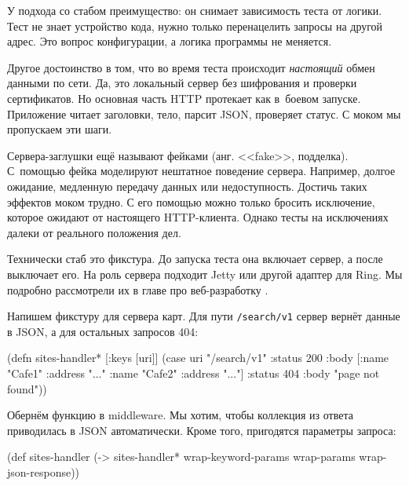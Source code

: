 У подхода со стабом преимущество: он снимает зависимость теста от логики. Тест
не знает устройство кода, нужно только перенацелить запросы на другой адрес. Это
вопрос конфигурации, а логика программы не меняется.

Другое достоинство в том, что во время теста происходит \emph{настоящий} обмен
данными по сети. Да, это локальный сервер без шифрования и проверки
сертификатов. Но основная часть HTTP протекает как в~боевом запуске. Приложение
читает заголовки, тело, парсит JSON, проверяет статус. С моком мы пропускаем эти
шаги.


Сервера-заглушки ещё называют фейками (анг. <<fake>>, подделка). С~помощью фейка
моделируют нештатное поведение сервера. Например, долгое ожидание, медленную
передачу данных или недоступность. Достичь таких эффектов моком трудно. С его
помощью можно только бросить исключение, которое ожидают от настоящего
HTTP-клиента. Однако тесты на исключениях далеки от реального положения дел.

Технически стаб это фикстура. До запуска теста она включает сервер, а после
выключает его. На роль сервера подходит Jetty или другой адаптер для Ring. Мы
подробно рассмотрели их в главе про веб-разработку .

Напишем фикстуру для сервера карт. Для пути \verb|/search/v1| сервер вернёт
данные в JSON, а для остальных запросов 404:

\label{sites-handler}

\begin{english}
  \begin{clojure}
(defn sites-handler* [{:keys [uri]}]
  (case uri
    "/search/v1"
    {:status 200
     :body [{:name "Cafe1" :address "..."}
            {:name "Cafe2" :address "..."}]}
    {:status 404
     :body "page not found"}))
  \end{clojure}
\end{english}


Обернём функцию в middleware. Мы хотим, чтобы коллекция из ответа приводилась в
JSON автоматически. Кроме того, пригодятся параметры запроса:

\begin{english}
  \begin{clojure}
(def sites-handler
  (-> sites-handler*
      wrap-keyword-params
      wrap-params
      wrap-json-response))
  \end{clojure}
\end{english}

